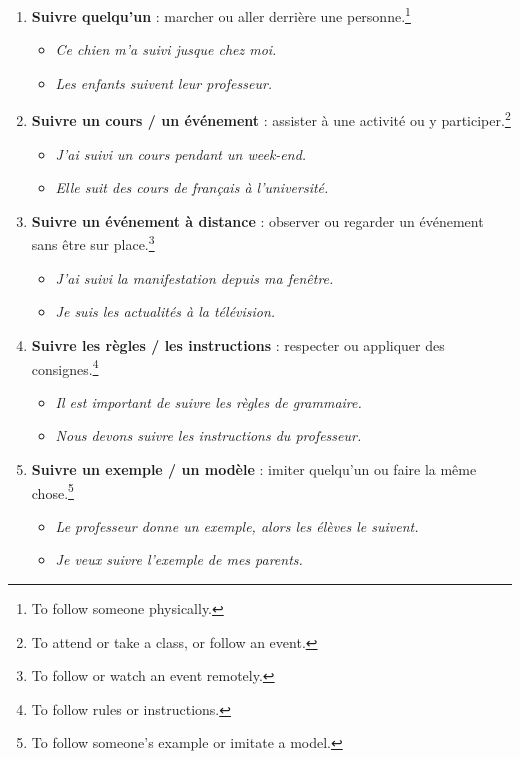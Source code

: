 \documentclass[math,code]{amznotes}
\theoremstyle{remark}
\begin{document}
\begin{enumerate}
    \item \textbf{Suivre quelqu'un} : marcher ou aller derrière une personne.\footnote{To follow someone physically.}
    \begin{itemize}
        \item \textit{Ce chien m'a suivi jusque chez moi.}
        \item \textit{Les enfants suivent leur professeur.}
    \end{itemize}

    \item \textbf{Suivre un cours / un événement} : assister à une activité ou y participer.\footnote{To attend or take a class, or follow an event.}
    \begin{itemize}
        \item \textit{J'ai suivi un cours pendant un week-end.}
        \item \textit{Elle suit des cours de français à l'université.}
    \end{itemize}

    \item \textbf{Suivre un événement à distance} : observer ou regarder un événement sans être sur place.\footnote{To follow or watch an event remotely.}
    \begin{itemize}
        \item \textit{J'ai suivi la manifestation depuis ma fenêtre.}
        \item \textit{Je suis les actualités à la télévision.}
    \end{itemize}

    \item \textbf{Suivre les règles / les instructions} : respecter ou appliquer des consignes.\footnote{To follow rules or instructions.}
    \begin{itemize}
        \item \textit{Il est important de suivre les règles de grammaire.}
        \item \textit{Nous devons suivre les instructions du professeur.}
    \end{itemize}

    \item \textbf{Suivre un exemple / un modèle} : imiter quelqu'un ou faire la même chose.\footnote{To follow someone's example or imitate a model.}
    \begin{itemize}
        \item \textit{Le professeur donne un exemple, alors les élèves le suivent.}
        \item \textit{Je veux suivre l'exemple de mes parents.}
    \end{itemize}


\end{enumerate}
\end{document}
